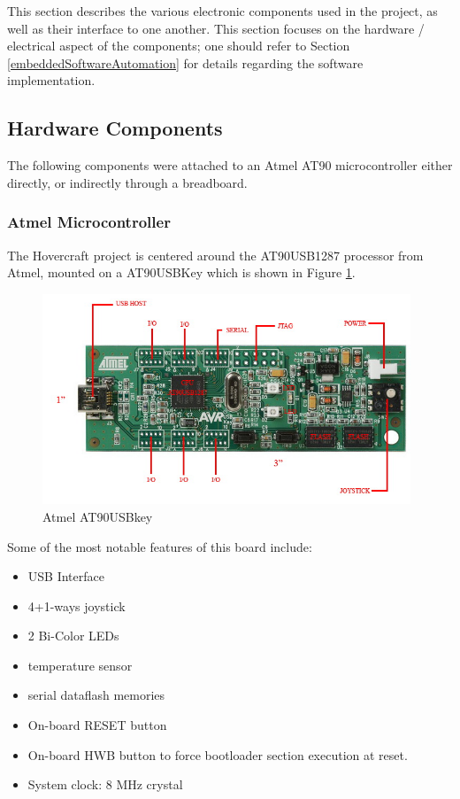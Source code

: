 This section describes the various electronic components used in the project, as well as their interface to one another.  This section focuses on the hardware / electrical aspect of the components; one should refer to Section \ref{embeddedSoftwareAutomation} for details regarding the software implementation.  

\subsection{Hardware Components}
The following components were attached to an Atmel AT90 microcontroller either directly, or indirectly through a breadboard.  

\subsubsection{Atmel Microcontroller}
The Hovercraft project is centered around the AT90USB1287 processor from Atmel, mounted on a AT90USBKey which is shown in Figure \ref{at90usbkey}.

\begin{figure}[h]
  \begin{center}
    \includegraphics[width=110mm]{imageSources/at90usbkey.png}
  \end{center}
  \caption{Atmel AT90USBkey} 
  \label{at90usbkey}
\end{figure}

Some of the most notable features of this board include:
\begin{itemize}
\item USB Interface
\item 4+1-ways joystick
\item 2 Bi-Color LEDs
\item temperature sensor
\item serial dataflash memories
\item On-board RESET button 
\item On-board HWB button to force bootloader section execution at reset.
\item System clock: 8 MHz crystal
\end{itemize}

